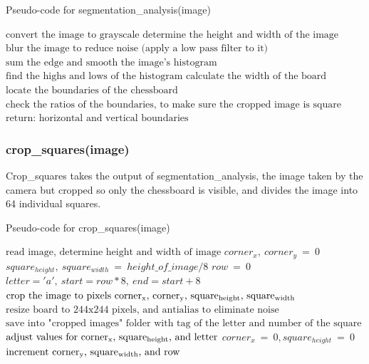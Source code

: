 \documentclass[onecolumn]{IEEEtran}
\begin{document}
\begin{algorithm}[H]
\caption{Pseudo-code for segmentation\_analysis(image)}
\begin{algorithmic}[1]
\STATE {}
\STATE$\text{convert the image to grayscale}$
\STATE$\text{determine the height and width of the image}$ 
\STATE$\text{blur the image to reduce noise (apply a low pass filter to it)}$
\STATE {}
\STATEx {} 
\STATE$\text{sum the edge and smooth the image's histogram}$ 
\STATE$\text{find the highs and lows of the histogram}$
\STATE$\text{calculate the width of the board}$
\STATE$\text{locate the boundaries of the chessboard}$
\STATE$\text{check the ratios of the boundaries, to make sure the cropped image is square}$
\STATE $\text{return: horizontal and vertical boundaries}$
\end{algorithmic}
\end{algorithm}

 
\subsubsection{crop\_squares(image)} 
Crop\_squares takes the output of segmentation\_analysis, the image taken by the camera but cropped so only the chessboard is visible, and divides the image into 64 individual squares. 

\begin{algorithm}[H]
\caption{Pseudo-code for crop\_squares(image)}
\begin{algorithmic}[1]
\STATE $\text{read image, determine height and width of image}$
\STATE $corner_x,\:corner_y\:=\:0$ 
\STATE $square_{height},\:square_{width}\:=\:height\_of\_image / 8$ 
\STATE $row\:=\:0$
\STATE $letter = 'a',\:start = row*8,\:end = start + 8$
\STATE $\text{crop the image to pixels corner\textsubscript{x}, corner\textsubscript{y}, square\textsubscript{height}, square\textsubscript{width}}$ 
\STATE $\text{resize board to 244x244 pixels, and antialias to eliminate noise}$ 
\STATE $\text{save into "cropped images" folder with tag of the letter and number of the square (letter, column)}$
\STATE $\text{adjust values for corner\textsubscript{x}, square\textsubscript{height}, and letter}$ 
\ENDFOR
\STATE $corner_x\:=\:0, square_{height}\:=\:0$
\STATE $\text{increment corner\textsubscript{y}, square\textsubscript{width}, and row}$ 
\ENDWHILE
\end{algorithmic}
\end{algorithm}
\end{document}
